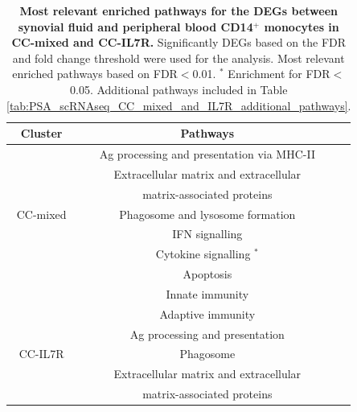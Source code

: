 \begin{table}[htbp]
\centering
\begin{tabular}{@{} c c c}
\toprule
\textbf{Cluster} & \textbf{Pathways} \\
\midrule
\midrule
         & Ag processing and presentation via MHC-II \\
				 & Extracellular matrix and extracellular \\
				 & matrix-associated proteins \\
CC-mixed & Phagosome and lysosome formation \\
				 & IFN signalling \\
				 & Cytokine signalling $^\ast$ \\
				 & Apoptosis \\
				 & Innate immunity \\
\midrule				
         & Adaptive immunity \\
         & Ag processing and presentation \\
CC-IL7R	 & Phagosome \\
         & Extracellular matrix and extracellular \\
				 & matrix-associated proteins \\
\bottomrule
\end{tabular}
\medskip %
\caption[Most relevant enriched pathways for the DEGs between synovial fluid and peripheral blood CD14$^+$ monocytes in CC-mixed and CC-IL7R.]{\textbf{Most relevant enriched pathways for the DEGs between synovial fluid and peripheral blood CD14$^+$ monocytes in CC-mixed and CC-IL7R.} Significantly DEGs based on the FDR and fold change threshold were used for the analysis. Most relevant enriched pathways based on FDR$<$0.01. $^\ast$ Enrichment for FDR$<$0.05. Additional pathways included in Table \ref{tab:PSA_scRNAseq_CC_mixed_and_IL7R_additional_pathways}.}
\label{tab:PSA_scRNAseq_CD14_DEGs_pathway_analysis}
\end{table}



